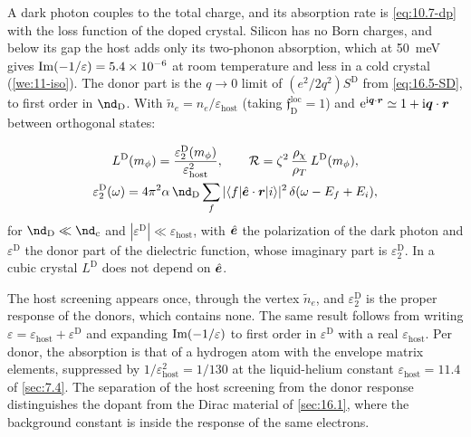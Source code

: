 A dark photon couples to the total charge, and its absorption rate is \cref{eq:10.7-dp} with the loss function of the doped crystal. Silicon has no Born charges, and below its gap the host adds only its two-phonon absorption, which at \SI{50}{meV} gives $\operatorname{Im}(-1/\varepsilon) = \num{5.4e-6}$ at room temperature and less in a cold crystal (\cref{we:11-iso}). The donor part is the $q \to 0$ limit of $(e^2/2q^2)S^{\mathrm{D}}$ from \cref{eq:16.5-SD}, to first order in $\nd_{\mathrm{D}}$. With $\tilde n_e = n_e/\varepsilon_{\mathrm{host}}$ (taking $\mathfrak{f}^{\mathrm{loc}}_{\mathrm{D}} = 1$) and $\mathrm{e}^{\mathrm{i}\bm{q}\cdot\bm{r}} \simeq 1 + \mathrm{i}\bm{q}\cdot\bm{r}$ between orthogonal states:
\begin{keyresult}
\begin{equation}
  \begin{gathered}
  L^{\mathrm{D}}(m_\phi) = \frac{\varepsilon_2^{\mathrm{D}}(m_\phi)}{\varepsilon_{\mathrm{host}}^2} , \qquad
  \mathcal{R} = \zeta^2\,\frac{\rho_\chi}{\rho_T}\,L^{\mathrm{D}}(m_\phi) , \\
  \varepsilon_2^{\mathrm{D}}(\omega) = 4\pi^2\alpha\,\nd_{\mathrm{D}}\sum_f|\langle f|\hat{\vect{e}}\cdot\vect{r}|i\rangle|^2\,\delta(\omega - E_f + E_i) ,
  \end{gathered}
  \label{eq:16.5-abs}
\end{equation}
for $\nd_{\mathrm{D}} \ll \nd_{\mathrm{c}}$ and $|\varepsilon^{\mathrm{D}}| \ll \varepsilon_{\mathrm{host}}$, with $\hat{\bm{e}}$ the polarization of the dark photon and $\varepsilon^{\mathrm{D}}$ the donor part of the dielectric function, whose imaginary part is $\varepsilon_2^{\mathrm{D}}$. In a cubic crystal $L^{\mathrm{D}}$ does not depend on $\hat{\bm{e}}$.
\end{keyresult}
\noindent The host screening appears once, through the vertex $\tilde n_e$, and $\varepsilon_2^{\mathrm{D}}$ is the proper response of the donors, which contains none. The same result follows from writing $\varepsilon = \varepsilon_{\mathrm{host}} + \varepsilon^{\mathrm{D}}$ and expanding $\operatorname{Im}(-1/\varepsilon)$ to first order in $\varepsilon^{\mathrm{D}}$ with a real $\varepsilon_{\mathrm{host}}$. Per donor, the absorption is that of a hydrogen atom with the envelope matrix elements, suppressed by $1/\varepsilon_{\mathrm{host}}^2 = 1/130$ at the liquid-helium constant $\varepsilon_{\mathrm{host}} = 11.4$ of \cref{sec:7.4}. The separation of the host screening from the donor response distinguishes the dopant from the Dirac material of \cref{sec:16.1}, where the background constant is inside the response of the same electrons.

